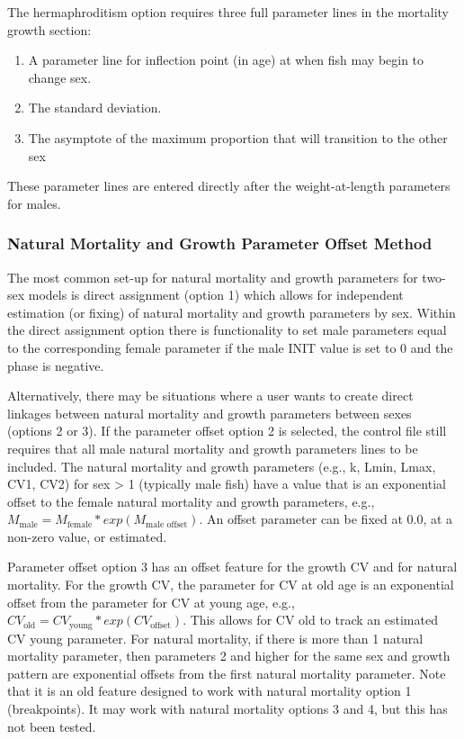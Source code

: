 The hermaphroditism option requires three full parameter lines in the mortality growth section: 
\begin{enumerate}
	\item A parameter line for inflection point (in age) at when fish may begin to change sex.
	\item The standard deviation.
	\item The asymptote of the maximum proportion that will transition to the other sex
\end{enumerate}
These parameter lines are entered directly after the weight-at-length parameters for males.

\pagebreak
\hypertarget{offset}{}
\subsubsection{Natural Mortality and Growth Parameter Offset Method}

The most common set-up for natural mortality and growth parameters for two-sex models is direct assignment (option 1) which allows for independent estimation (or fixing) of natural mortality and growth parameters by sex. Within the direct assignment option there is functionality to set male parameters equal to the corresponding female parameter if the male INIT value is set to 0 and the phase is negative. 

Alternatively, there may be situations where a user wants to create direct linkages between natural mortality and growth parameters between sexes (options 2 or 3). If the parameter offset option 2 is selected, the control file still requires that all male natural mortality and growth parameters lines to be included. The natural mortality and growth parameters (e.g., k, Lmin, Lmax, CV1, CV2) for sex > 1 (typically male fish) have a value that is an exponential offset to the female natural mortality and growth parameters, e.g., $M_{\text{male}} = M_{\text{female}}*exp(M_{\text{male offset}})$. An offset parameter can be fixed at 0.0, at a non-zero value, or estimated.

Parameter offset option 3 has an offset feature for the growth CV and for natural mortality. For the growth CV, the parameter for CV at old age is an exponential offset from the parameter for CV at young age, e.g., $CV_{\text{old}} = CV_{\text{young}}*exp(CV_{\text{offset}})$. This allows for CV old to track an estimated CV young parameter. For natural mortality, if there is more than 1 natural mortality parameter, then parameters 2 and higher for the same sex and growth pattern are exponential offsets from the first natural mortality parameter. Note that it is an old feature designed to work with natural mortality option 1 (breakpoints). It may work with natural mortality options 3 and 4, but this has not been tested.


